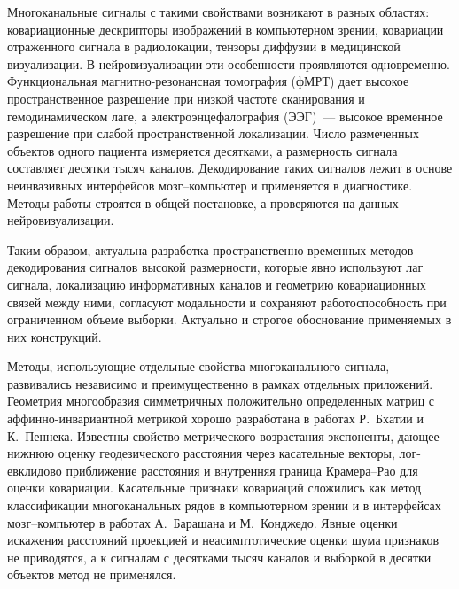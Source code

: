 Многоканальные сигналы с такими свойствами возникают в разных областях: ковариационные дескрипторы изображений в компьютерном зрении, ковариации отраженного сигнала в радиолокации, тензоры диффузии в медицинской визуализации. В нейровизуализации эти особенности проявляются одновременно. Функциональная магнитно-резонансная томография (фМРТ) дает высокое пространственное разрешение при низкой частоте сканирования и гемодинамическом лаге, а электроэнцефалография (ЭЭГ)~--- высокое временное разрешение при слабой пространственной локализации. Число размеченных объектов одного пациента измеряется десятками, а размерность сигнала составляет десятки тысяч каналов. Декодирование таких сигналов лежит в основе неинвазивных интерфейсов мозг--компьютер и применяется в диагностике. Методы работы строятся в общей постановке, а проверяются на данных нейровизуализации.

Таким образом, актуальна разработка пространственно-временных методов декодирования сигналов высокой размерности, которые явно используют лаг сигнала, локализацию информативных каналов и геометрию ковариационных связей между ними, согласуют модальности и сохраняют работоспособность при ограниченном объеме выборки. Актуально и строгое обоснование применяемых в них конструкций.

{\progress} Методы, использующие отдельные свойства многоканального сигнала, развивались независимо и преимущественно в рамках отдельных приложений. Геометрия многообразия симметричных положительно определенных матриц с аффинно-инвариантной метрикой хорошо разработана в работах Р.~Бхатии и К.~Пеннека. Известны свойство метрического возрастания экспоненты, дающее нижнюю оценку геодезического расстояния через касательные векторы, лог-евклидово приближение расстояния и внутренняя граница Крамера--Рао для оценки ковариации. Касательные признаки ковариаций сложились как метод классификации многоканальных рядов в компьютерном зрении и в интерфейсах мозг--компьютер в работах А.~Барашана и М.~Конджедо. Явные оценки искажения расстояний проекцией и неасимптотические оценки шума признаков не приводятся, а к сигналам с десятками тысяч каналов и выборкой в десятки объектов метод не применялся.

